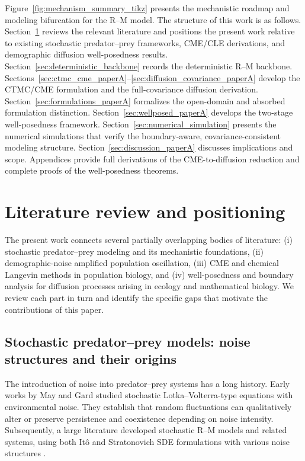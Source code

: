 \documentclass[pdflatex,sn-mathphys-ay]{sn-jnl}
\theoremstyle{thmstyleone}
\theoremstyle{definition}
\theoremstyle{remark}
\begin{document}
Figure~\ref{fig:mechanism_summary_tikz} presents the mechanistic roadmap and modeling bifurcation for the R--M model. The structure of this work is as follows.
Section~\ref{sec:literature_paperA} reviews the relevant literature and positions the present work relative to existing stochastic predator--prey frameworks, CME/CLE derivations, and demographic diffusion well-posedness results. 
Section~\ref{sec:deterministic_backbone} records the deterministic R--M backbone. Sections~\ref{sec:ctmc_cme_paperA}--\ref{sec:diffusion_covariance_paperA} develop the CTMC/CME formulation and the full-covariance diffusion derivation. 
Section~\ref{sec:formulations_paperA} formalizes the open-domain and absorbed formulation distinction. Section~\ref{sec:wellposed_paperA} develops the two-stage well-posedness framework. 
Section~\ref{sec:numerical_simulation} presents the numerical simulations that verify the boundary-aware, covariance-consistent modeling structure.
Section~\ref{sec:discussion_paperA} discusses implications and scope. Appendices provide full derivations of the CME-to-diffusion reduction and complete proofs of the well-posedness theorems.



\section{Literature review and positioning}
\label{sec:literature_paperA}

The present work connects several partially overlapping bodies of literature: 
(i) stochastic predator--prey modeling and its mechanistic foundations, 
(ii) demographic-noise amplified population oscillation,
(iii) CME and chemical Langevin methods in population biology,
and (iv) well-posedness and boundary analysis for diffusion processes arising in ecology and mathematical biology. 
We review each part in turn and identify the specific gaps that motivate the contributions of this paper.

\subsection{Stochastic predator--prey models: noise structures and their origins}

The introduction of noise into predator--prey systems has a long history. 
Early works by May \citep{may_stability_2001} and Gard \citep{gard_persistence_1984} studied stochastic Lotka--Volterra-type equations with environmental noise. 
They establish that random fluctuations can qualitatively alter or preserve persistence and coexistence depending on noise intensity. 
Subsequently, a large literature developed stochastic R--M models and related systems, using both It\^o and Stratonovich SDE formulations with various noise structures \citep{yuan_bifurcation_2023,barraquand_no_2023,braumann_variable_2002,braumann_ito_2007,liu_survival_2011,zhao_survival_2015}.
\end{document}

